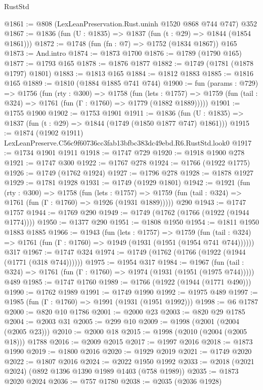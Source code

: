\begin{lexlean}{RustStd}
\begin{coremodule}
@1861 := @808 (LexLeanPreservation.Rust.uninh @1520 @868 @744 @747) @352
@1867 := @1836 (fun (U : @1835) => @1837 (fun (t : @29) => @1844 (@1854 @1861)))
@1872 := @1748 (fun (fn : @7) => @1752 (@1834 @1867)) @165
@1873 := And.intro
@1874 := @1873 @1700
@1876 := @1789 (@1790 @165)
@1877 := @1793 @165
@1878 := @1876 @1877
@1882 := @1749 (@1781 (@1878 @1797) @1801)
@1883 := @1813 @165
@1884 := @1812 @1883
@1885 := @1816 @165
@1889 := @1810 (@1884 @1885 @741 @744)
@1900 := fun (params : @729) =>
  @1756
    (fun (rty : @300) =>
    @1758
      (fun (lets : @1757) =>
      @1759 (fun (tail : @324) => @1761 (fun (Γ : @1760) => @1779 (@1882 @1889)))))
@1901 := @1755 @1900
@1902 := @1753 @1901
@1911 := @1836 (fun (U : @1835) => @1837 (fun (t : @29) => @1844 (@1749 (@1850 @1877 @747) @1861)))
@1915 := @1874 (@1902 @1911) LexLeanPreserve.C56c9f60736cc3fab13bfbc383dc49ebd.R6.RustStd.look0
@1917 := @1734 @1901 @1911
@1918 := @1747 @729
@1920 := @1918 @1900 @278
@1921 := @1747 @300
@1922 := @1767 @278
@1924 := @1766 (@1922 @1775)
@1926 := @1749 (@1762 @1924)
@1927 := @1796 @278
@1928 := @1878 @1927
@1929 := @1781 @1928
@1931 := @1749 (@1929 @1801)
@1942 := @1921
    (fun (rty : @300) =>
    @1758
      (fun (lets : @1757) =>
      @1759 (fun (tail : @324) => @1761 (fun (Γ : @1760) => @1926 (@1931 @1889)))))
    @290
@1943 := @1747 @1757
@1944 := @1769 @290
@1949 := @1749 (@1762 (@1766 (@1922 (@1944 @1774))))
@1950 := @1377 @290
@1951 := @1808 @1950
@1954 := @1811 @1950 @1883 @1885
@1966 := @1943
    (fun (lets : @1757) =>
    @1759 (fun (tail : @324) => @1761 (fun (Γ : @1760) => @1949 (@1931 (@1951 (@1954 @741 @744))))))
    @317
@1967 := @1747 @324
@1974 := @1749 (@1762 (@1766 (@1922 (@1944 (@1771 (@318 @744))))))
@1975 := @1954 @317
@1984 := @1967
    (fun (tail : @324) => @1761 (fun (Γ : @1760) => @1974 (@1931 (@1951 (@1975 @744)))))
    @489
@1985 := @1747 @1760
@1989 := @1766 (@1922 (@1944 (@1771 @490)))
@1990 := @1762 @1989
@1991 := @1749 @1990
@1992 := @1975 @489
@1997 := @1985 (fun (Γ : @1760) => @1991 (@1931 (@1951 @1992)))
@1998 := @6 @1787
@2000 := @820 @10 @1786
@2001 := @2000 @23
@2003 := @820 @29 @1785
@2004 := @2003 @31
@2005 := @299 @10
@2009 := @1998 (@2001 (@2004 (@2005 @23)))
@2010 := @2000 @18
@2015 := @1998 (@2010 (@2004 (@2005 @18))) @1788
@2016 := @2009 @2015
@2017 := @1997 @2016
@2018 := @1873 @1990
@2019 := @1800 @2016
@2020 := @1929 @2019
@2021 := @1749 @2020
@2022 := @1807 @2016
@2024 := @2022 @1950 @1992
@2033 := @2018 (@2021 @2024) (@892 @1396 @1390 @1989 @1403 (@758 @1989))
@2035 := @1873 @2020 @2024
@2036 := @757 @1780
@2038 := @2035 (@2036 @1928)

\end{coremodule}
\end{lexlean}
